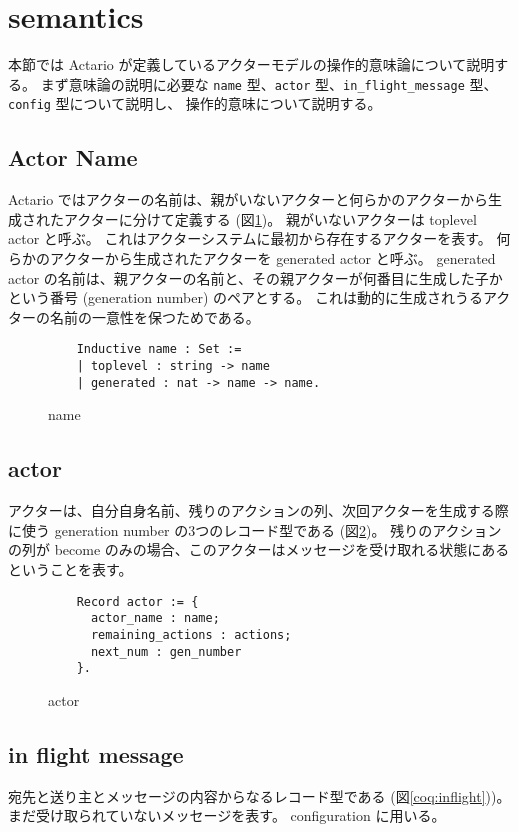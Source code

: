 \section{semantics}
\label{sec:semantics}

本節では Actario が定義しているアクターモデルの操作的意味論について説明する。
まず意味論の説明に必要な \texttt{name} 型、\texttt{actor} 型、\texttt{in\_flight\_message} 型、\texttt{config} 型について説明し、
操作的意味について説明する。

\subsection{Actor Name}
Actario ではアクターの名前は、親がいないアクターと何らかのアクターから生成されたアクターに分けて定義する (図\ref{coq:name})。
親がいないアクターは toplevel actor と呼ぶ。
これはアクターシステムに最初から存在するアクターを表す。
何らかのアクターから生成されたアクターを generated actor と呼ぶ。
generated actor の名前は、親アクターの名前と、その親アクターが何番目に生成した子かという番号 (generation number) のペアとする。
これは動的に生成されうるアクターの名前の一意性を保つためである。

\begin{figure}[tb]
  \begin{lstlisting}
    Inductive name : Set :=
    | toplevel : string -> name
    | generated : nat -> name -> name.
  \end{lstlisting}
  \caption{name}\label{coq:name}
\end{figure}


\subsection{actor}
アクターは、自分自身名前、残りのアクションの列、次回アクターを生成する際に使う generation number の3つのレコード型である (図\ref{coq:actor})。
残りのアクションの列が become のみの場合、このアクターはメッセージを受け取れる状態にあるということを表す。

\begin{figure}[tb]
  \begin{lstlisting}
    Record actor := {
      actor_name : name;
      remaining_actions : actions;
      next_num : gen_number
    }.
  \end{lstlisting}
  \caption{actor}\label{coq:actor}
\end{figure}

\subsection{in flight message}
宛先と送り主とメッセージの内容からなるレコード型である (図\ref{coq:inflight}))。
まだ受け取られていないメッセージを表す。
configuration に用いる。

